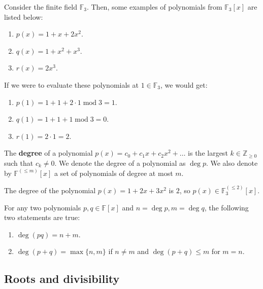 \documentclass[../lecture-notes.tex]{subfiles}
\begin{document}
\begin{example}
    Consider the finite field $\mathbb{F}_3$. Then, some examples of polynomials from $\mathbb{F}_3[x]$ are listed below:
    \begin{enumerate}
        \item $p(x) = 1 + x + 2x^2$.
        \item $q(x) = 1 + x^2 + x^3$.
        \item $r(x) = 2x^3$.
    \end{enumerate}

   If we were to evaluate these polynomials at $1 \in \mathbb{F}_3$, we would get:
    \begin{enumerate}
        \item $p(1) = 1 + 1 + 2 \cdot 1 \; \text{mod} \; 3 = 1$.
        \item $q(1) = 1 + 1 + 1 \; \text{mod} \; 3 = 0$.
        \item $r(1) = 2 \cdot 1 = 2$.
    \end{enumerate}
\end{example}

\begin{definition}
    The \textbf{degree} of a polynomial $p(x) = c_0+c_1x+c_2x^2+\dots$ is the largest $k \in \mathbb{Z}_{\geq 0}$ such that $c_k \neq 0$. We denote the degree of a polynomial as $\deg p$. We also denote by $\mathbb{F}^{(\leq m)}[x]$ a set of polynomials of degree at most $m$.
\end{definition}

\begin{example}
    The degree of the polynomial $p(x) = 1 + 2x + 3x^2$ is $2$, so $p(x) \in \mathbb{F}_3^{(\leq 2)}[x]$.
\end{example}

\begin{theorem}
    For any two polynomials $p,q \in \mathbb{F}[x]$ and $n = \deg p, m = \deg q$, the following two statements are true:
    \begin{enumerate}
        \item $\deg (pq) = n + m$.
        \item $\deg (p + q) = \max\{n,m\}$ if $n \neq m$ and $\deg (p+q) \leq m$ for $m=n$.
    \end{enumerate}
\end{theorem}

\subsection{Roots and divisibility}
\end{document}
